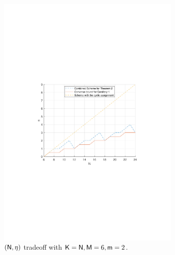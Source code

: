\documentclass[conference,letterpaper]{IEEEtran}
\begin{document}
\begin{figure}[ht]
\begin{subfigure}[t]{0.5\textwidth}
        \includegraphics[scale=0.45]{N varies.pdf}
        \caption{\small $({\sf N},\eta)$ tradeoff with ${\sf K} = {\sf N}, {\sf M}=6, {\sf m}=2$.}
        \label{fig:numerical 1b}
    \end{subfigure}\\
    \begin{subfigure}[t]{0.5\textwidth}
        \centering

\end{subfigure}
\end{figure}
\end{document}
